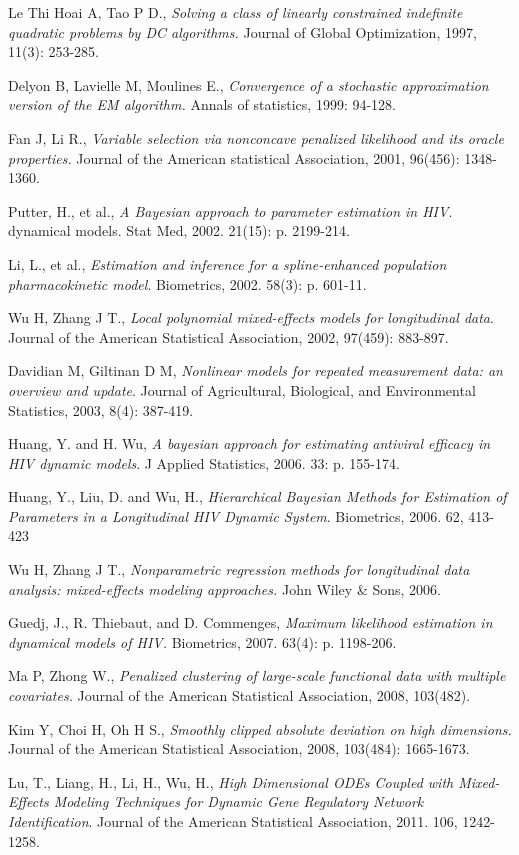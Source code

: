 \documentclass[12pt]{extarticle}
\begin{document}
\begin{thebibliography}{9}

Le Thi Hoai A, Tao P D., 
\emph{Solving a class of linearly constrained indefinite quadratic problems by DC algorithms.} 
Journal of Global Optimization, 1997, 11(3): 253-285.

Delyon B, Lavielle M, Moulines E., 
\emph{Convergence of a stochastic approximation version of the EM algorithm.} 
Annals of statistics, 1999: 94-128.

Fan J, Li R.,
\emph{Variable selection via nonconcave penalized likelihood and its oracle properties.} 
Journal of the American statistical Association, 2001, 96(456): 1348-1360.

Putter, H., et al., 
\emph{A Bayesian approach to parameter estimation in HIV}. 
dynamical models. Stat Med, 2002. 21(15): p. 2199-214.

Li, L., et al., 
\emph{Estimation and inference for a spline-enhanced population pharmacokinetic model}. 
Biometrics, 2002. 58(3): p. 601-11.

Wu H, Zhang J T., 
\emph{Local polynomial mixed-effects models for longitudinal data}. 
Journal of the American Statistical Association, 2002, 97(459): 883-897.

Davidian M, Giltinan D M, 
\emph{Nonlinear models for repeated measurement data: an overview and update}. 
Journal of Agricultural, Biological, and Environmental Statistics, 2003, 8(4): 387-419.

Huang, Y. and H. Wu, 
\emph{A bayesian approach for estimating antiviral efficacy in HIV dynamic models}. 
J Applied Statistics, 2006. 33: p. 155-174.

Huang, Y., Liu, D. and Wu, H., 
\emph{Hierarchical Bayesian Methods for Estimation of Parameters in a Longitudinal HIV Dynamic System}. 
Biometrics, 2006. 62, 413-423

Wu H, Zhang J T., 
\emph{Nonparametric regression methods for longitudinal data analysis: mixed-effects modeling approaches.} 
John Wiley \& Sons, 2006.

Guedj, J., R. Thiebaut, and D. Commenges, 
\emph{Maximum likelihood estimation in dynamical models of HIV.} 
Biometrics, 2007. 63(4): p. 1198-206.

Ma P, Zhong W., 
\emph{Penalized clustering of large-scale functional data with multiple covariates.} 
Journal of the American Statistical Association, 2008, 103(482).

Kim Y, Choi H, Oh H S., 
\emph{Smoothly clipped absolute deviation on high dimensions.} 
Journal of the American Statistical Association, 2008, 103(484): 1665-1673.

Lu, T., Liang, H., Li, H., Wu, H., 
\emph{High Dimensional ODEs Coupled with Mixed-Effects Modeling Techniques for Dynamic Gene Regulatory Network Identification}. 
Journal of the American Statistical Association, 2011. 106, 1242-1258.

\end{thebibliography}
\end{document}

